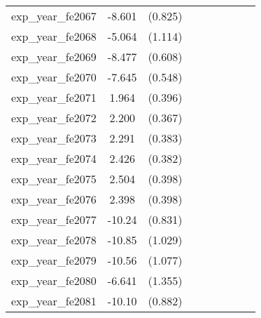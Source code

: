 {\begin{tabular}{l*{4}{cc}}
exp\_year\_fe2067&   -8.601\sym{***}&  (0.825)&                  &         &                  &         &                  &         \\
exp\_year\_fe2068&   -5.064\sym{***}&  (1.114)&                  &         &                  &         &                  &         \\
exp\_year\_fe2069&   -8.477\sym{***}&  (0.608)&                  &         &                  &         &                  &         \\
exp\_year\_fe2070&   -7.645\sym{***}&  (0.548)&                  &         &                  &         &                  &         \\
exp\_year\_fe2071&    1.964\sym{***}&  (0.396)&                  &         &                  &         &                  &         \\
exp\_year\_fe2072&    2.200\sym{***}&  (0.367)&                  &         &                  &         &                  &         \\
exp\_year\_fe2073&    2.291\sym{***}&  (0.383)&                  &         &                  &         &                  &         \\
exp\_year\_fe2074&    2.426\sym{***}&  (0.382)&                  &         &                  &         &                  &         \\
exp\_year\_fe2075&    2.504\sym{***}&  (0.398)&                  &         &                  &         &                  &         \\
exp\_year\_fe2076&    2.398\sym{***}&  (0.398)&                  &         &                  &         &                  &         \\
exp\_year\_fe2077&   -10.24\sym{***}&  (0.831)&                  &         &                  &         &                  &         \\
exp\_year\_fe2078&   -10.85\sym{***}&  (1.029)&                  &         &                  &         &                  &         \\
exp\_year\_fe2079&   -10.56\sym{***}&  (1.077)&                  &         &                  &         &                  &         \\
exp\_year\_fe2080&   -6.641\sym{***}&  (1.355)&                  &         &                  &         &                  &         \\
exp\_year\_fe2081&   -10.10\sym{***}&  (0.882)&                  &         &                  &         &                  &         \\

\end{tabular}}
